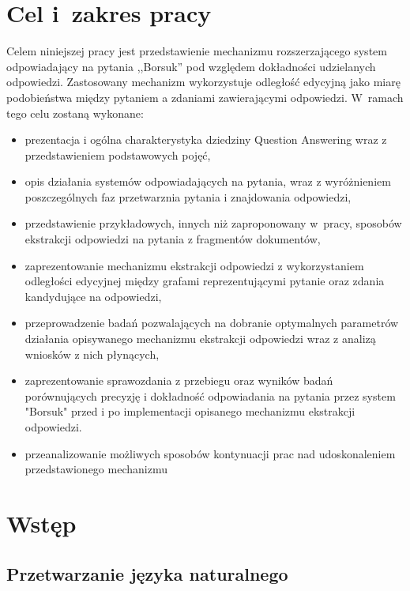 \documentclass[a4paper, twoside, 12pt]{report}
\begin{document}
\chapter{Cel i~zakres pracy}
    Celem niniejszej pracy jest przedstawienie mechanizmu rozszerzającego system odpowiadający na pytania ,,Borsuk''
    pod względem dokładności udzielanych odpowiedzi. Zastosowany mechanizm wykorzystuje odległość edycyjną jako miarę
    podobieństwa między pytaniem a zdaniami zawierającymi odpowiedzi. W~ramach tego celu zostaną wykonane:
    \begin{itemize}
        \item prezentacja i ogólna charakterystyka dziedziny Question Answering wraz z przedstawieniem podstawowych
            pojęć,
        \item opis działania systemów odpowiadających na pytania, wraz z wyróżnieniem poszczególnych faz przetwarznia
            pytania i znajdowania odpowiedzi,
        \item przedstawienie przykładowych, innych niż zaproponowany w~pracy,
            sposobów ekstrakcji odpowiedzi na pytania z fragmentów dokumentów,
        \item zaprezentowanie mechanizmu ekstrakcji odpowiedzi z wykorzystaniem odległości edycyjnej między grafami
            reprezentującymi pytanie oraz zdania kandydujące na odpowiedzi,
        \item przeprowadzenie badań pozwalających na dobranie optymalnych parametrów działania opisywanego
            mechanizmu ekstrakcji odpowiedzi wraz z analizą wniosków z nich płynących,
       \item zaprezentowanie sprawozdania z przebiegu oraz wyników badań porównujących precyzję i dokładność
           odpowiadania na pytania przez system "Borsuk" przed i po implementacji opisanego mechanizmu ekstrakcji
           odpowiedzi.
       \item przeanalizowanie możliwych sposobów kontynuacji prac nad udoskonaleniem przedstawionego mechanizmu

    \end{itemize}

\chapter{Wstęp}
    \section{Przetwarzanie języka naturalnego}
\end{document}
